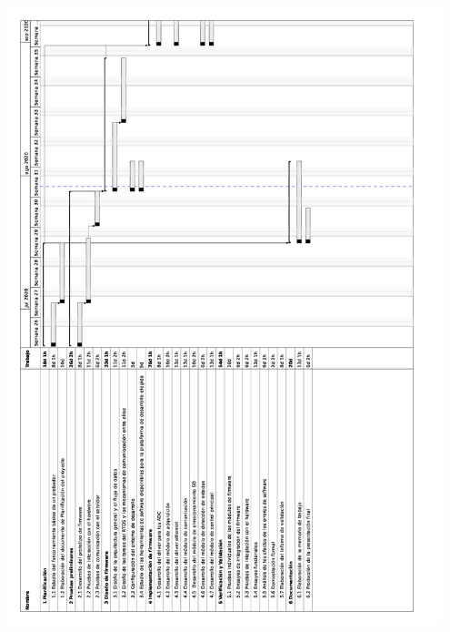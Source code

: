 \documentclass[11pt]{charter}
\begin{document}
\begin{center}
\includegraphics[width=0.95\textwidth, angle=180]{./Figuras/gantt-0.jpg}
\label{fig:gantt}
\end{center}
\end{document}
